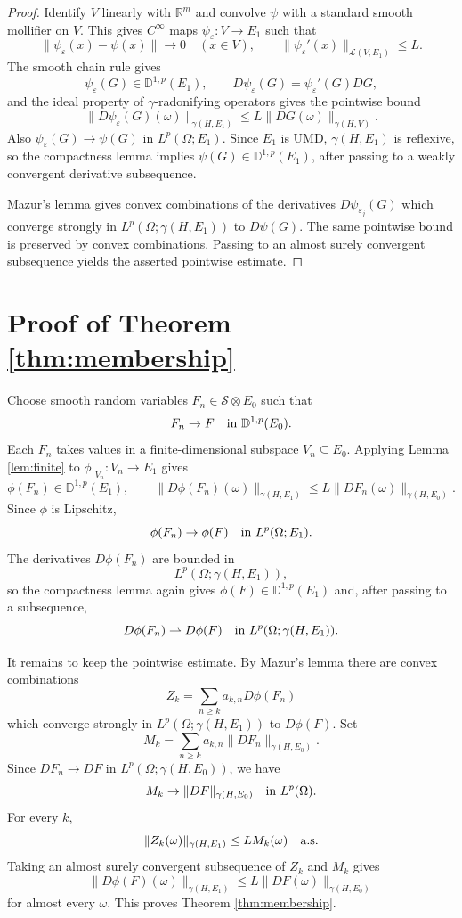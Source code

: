 \documentclass[11pt]{article}
\newcommand{\R}{\mathbb{R}}
\newcommand{\D}{\mathbb{D}}
\newcommand{\g}{\gamma}
\newcommand{\cL}{\mathcal L}
\begin{document}
\begin{proof}
Identify \(V\) linearly with \(\R^m\) and convolve \(\psi\) with a standard
smooth mollifier on \(V\).  This gives \(C^\infty\) maps
\(\psi_\varepsilon:V\to E_1\) such that
\[
  \|\psi_\varepsilon(x)-\psi(x)\|\to0\quad (x\in V),
  \qquad
  \|\psi_\varepsilon'(x)\|_{\cL(V,E_1)}\leq L .
\]
The smooth chain rule \cite[Proposition 3.9]{PV} gives
\[
  \psi_\varepsilon(G)\in\D^{1,p}(E_1),\qquad
  D\psi_\varepsilon(G)=\psi_\varepsilon'(G)DG,
\]
and the ideal property of \(\gamma\)-radonifying operators gives the pointwise
bound
\[
  \|D\psi_\varepsilon(G)(\omega)\|_{\g(H,E_1)}
  \leq L\|DG(\omega)\|_{\g(H,V)} .
\]
Also \(\psi_\varepsilon(G)\to\psi(G)\) in \(L^p(\Omega;E_1)\).  Since \(E_1\)
is UMD, \(\g(H,E_1)\) is reflexive, so the compactness lemma
\cite[Lemma 3.8]{PV} implies \(\psi(G)\in\D^{1,p}(E_1)\), after passing to a
weakly convergent derivative subsequence.

Mazur's lemma gives convex combinations of the derivatives
\(D\psi_{\varepsilon_j}(G)\) which converge strongly in
\(L^p(\Omega;\g(H,E_1))\) to \(D\psi(G)\).  The same pointwise bound is
preserved by convex combinations.  Passing to an almost surely convergent
subsequence yields the asserted pointwise estimate.
\end{proof}

\section*{Proof of Theorem \ref{thm:membership}}

Choose smooth random variables \(F_n\in\mathscr S\otimes E_0\) such that
\[
  F_n\to F \quad\hbox{in }\D^{1,p}(E_0).
\]
Each \(F_n\) takes values in a finite-dimensional subspace \(V_n\subseteq E_0\).
Applying Lemma \ref{lem:finite} to \(\phi|_{V_n}:V_n\to E_1\) gives
\[
  \phi(F_n)\in\D^{1,p}(E_1),\qquad
  \|D\phi(F_n)(\omega)\|_{\g(H,E_1)}
  \leq L\|DF_n(\omega)\|_{\g(H,E_0)} .
\]
Since \(\phi\) is Lipschitz,
\[
  \phi(F_n)\to\phi(F) \quad\hbox{in } L^p(\Omega;E_1).
\]
The derivatives \(D\phi(F_n)\) are bounded in
\[
  L^p(\Omega;\g(H,E_1)),
\]
so the compactness lemma again gives
\(\phi(F)\in\D^{1,p}(E_1)\) and, after passing to a subsequence,
\[
  D\phi(F_n)\rightharpoonup D\phi(F)
  \quad\hbox{in }L^p(\Omega;\g(H,E_1)).
\]

It remains to keep the pointwise estimate.  By Mazur's lemma there are convex
combinations
\[
  Z_k=\sum_{n\geq k} a_{k,n}D\phi(F_n)
\]
which converge strongly in \(L^p(\Omega;\g(H,E_1))\) to \(D\phi(F)\).  Set
\[
  M_k=\sum_{n\geq k} a_{k,n}\|DF_n\|_{\g(H,E_0)} .
\]
Since \(DF_n\to DF\) in \(L^p(\Omega;\g(H,E_0))\), we have
\[
  M_k\to \|DF\|_{\g(H,E_0)}
  \quad\hbox{in }L^p(\Omega).
\]
For every \(k\),
\[
  \|Z_k(\omega)\|_{\g(H,E_1)}\leq L M_k(\omega)
  \quad\hbox{a.s.}
\]
Taking an almost surely convergent subsequence of \(Z_k\) and \(M_k\) gives
\[
  \|D\phi(F)(\omega)\|_{\g(H,E_1)}
  \leq L\|DF(\omega)\|_{\g(H,E_0)}
\]
for almost every \(\omega\).  This proves Theorem \ref{thm:membership}.
\end{document}
